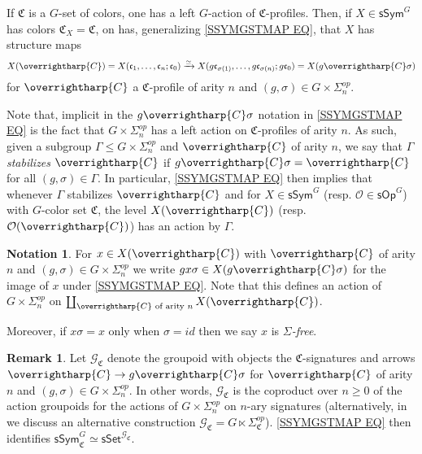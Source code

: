 \documentclass[a4paper,10pt
,draft
]{article}%
\numberwithin{equation}{section}
\numberwithin{figure}{section}
\theoremstyle{definition} %
\newtheorem{remark}[equation]{Remark}%
\newtheorem{notation}[equation]{Notation}%
\newcommand{\vect}[1]{\text{\overrightharp{\ensuremath{#1}}}}
\renewcommand{\O}{\ensuremath{\mathcal O}}
\newcommand{\1}{\ensuremath{\mathbbm 1}}%
\begin{document}
If $\mathfrak{C}$ is a $G$-set of colors, 
one has a left $G$-action of $\mathfrak{C}$-profiles.
Then, if $X \in \mathsf{sSym}^G$
has colors $\mathfrak{C}_X =\mathfrak{C}$,
on has, generalizing
\eqref{SSYMGSTMAP EQ},
that $X$ has structure maps
\begin{equation}\label{SSYMGSTMAP EQ}
X(\vect{C}) = 
X(\mathfrak c_1, \dots, \mathfrak c_n; \mathfrak c_0) \xrightarrow{\simeq} 
X(g\mathfrak c_{\sigma(1)}, \dots, g \mathfrak c_{\sigma(n)}; g \mathfrak c_0) =	
X(g \vect{C}\sigma)
\end{equation}
for $\vect{C}$ a $\mathfrak{C}$-profile of arity $n$
and
$(g,\sigma) \in G \times \Sigma^{op}_n$.

Note that, implicit in the $g \vect{C} \sigma$ notation in
\eqref{SSYMGSTMAP EQ}
is the fact that $G \times \Sigma_n^{op}$
has a left action on 
$\mathfrak{C}$-profiles of arity $n$.
As such, given a subgroup
$\Gamma \leq G \times \Sigma_n^{op}$
and $\vect{C}$ of arity $n$, we say that 
\emph{$\Gamma$ stabilizes $\vect{C}$} 
if 
$g \vect{C} \sigma = \vect{C}$
for all $(g,\sigma) \in \Gamma$.
In particular, 
\eqref{SSYMGSTMAP EQ}
then implies that whenever $\Gamma$ stabilizes $\vect{C}$
and for
$X\in \mathsf{sSym}^G$
(resp.
$\O \in \mathsf{sOp}^G$)
with $G$-color set $\mathfrak{C}$,
the level
$X(\vect{C})$
(resp. $\O(\vect{C})$)
has an action by $\Gamma$.


\begin{notation}\label{SIGFREE NOT}
	For $x \in X(\vect{C})$
	with $\vect{C}$ of arity $n$ and 
	$(g,\sigma) \in G \times \Sigma_n^{op}$
	we write
	$gx\sigma \in X(g \vect{C} \sigma)$
	for the image of $x$ under 
	\eqref{SSYMGSTMAP EQ}.
	Note that this defines an action of
	$G \times \Sigma_n^{op}$
	on $\coprod_{\vect{C} \text{ of arity }n} X(\vect{C})$.
	
	Moreover, if $x \sigma = x$ only when $\sigma = id$ then we say 
	$x$ is \emph{$\Sigma$-free}.
\end{notation}




\begin{remark}\label{SYMGCPRESH REM}
	Let $\mathcal{G}_{\mathfrak{C}}$
	denote the groupoid with objects the 
	$\mathfrak{C}$-signatures
	and arrows 
	$\vect{C} \to g \vect{C} \sigma$
	for $\vect{C}$ of arity $n$
	and $(g,\sigma) \in G \times \Sigma^{op}_n$.
	In other words, 
	$\mathcal{G}_{\mathfrak{C}}$
	is the coproduct over $n\geq 0$ of the action groupoids 
	for the actions of
	$G \times \Sigma^{op}_n$
	on $n$-ary signatures
	(alternatively, in \cite{BP_HGOP} 
	we discuss an 
	{\color{red} alternative construction
	$\mathcal{G}_{\mathfrak{C}}
	= G \ltimes \Sigma_{\mathfrak{C}}^{op}$}).
%	
	\eqref{SSYMGSTMAP EQ} then identifies 
	$\mathsf{sSym}^G_{\mathfrak{C}} \simeq 
	\mathsf{sSet}^{\mathcal{G}_{\mathfrak{C}}}$.	
\end{remark}
\end{document}
